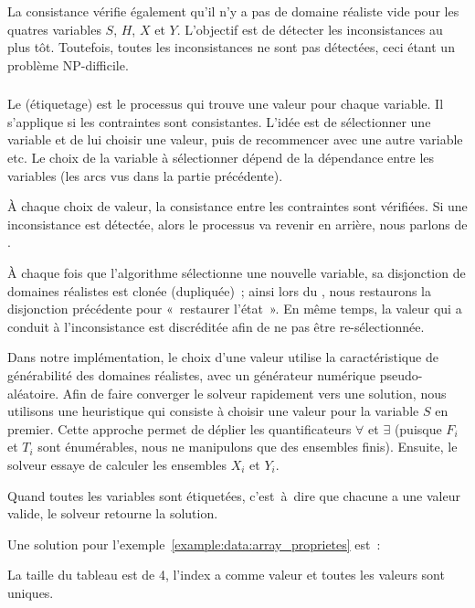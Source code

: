 La consistance vérifie également qu'il n'y a pas de domaine réaliste vide pour
les quatres variables $S$, $H$, $X$ et $Y$. L'objectif est de détecter les
inconsistances au plus tôt. Toutefois, toutes les inconsistances ne sont pas
détectées, ceci étant un problème NP-difficile.

\subsubsection{}

Le  (étiquetage) est le processus qui trouve une valeur
pour chaque variable. Il s'applique si les contraintes sont consistantes. L'idée
est de sélectionner une variable et de lui choisir une valeur, puis de
recommencer avec une autre variable etc. Le choix de la variable à sélectionner
dépend de la dépendance entre les variables (les arcs vus dans la partie
précédente).

À chaque choix de valeur, la consistance entre les contraintes sont
vérifiées. Si une inconsistance est détectée, alors le processus va revenir en
arrière, nous parlons de .

À chaque fois que l'algorithme sélectionne une nouvelle variable, sa disjonction
de domaines réalistes est clonée (dupliquée)~; ainsi lors du
, nous restaurons la disjonction précédente pour
«~restaurer l'état~». En même temps, la valeur qui a conduit à l'inconsistance
est discréditée afin de ne pas être re-sélectionnée.

Dans notre implémentation, le choix d'une valeur utilise la caractéristique de
générabilité des domaines réalistes, avec un générateur numérique
pseudo-aléatoire. Afin de faire converger le solveur rapidement vers une
solution, nous utilisons une heuristique qui consiste à choisir une valeur pour
la variable $S$ en premier.  Cette approche permet de déplier les
quantificateurs $\forall$ et $\exists$ (puisque $F_i$ et $T_i$ sont énumérables,
nous ne manipulons que des ensembles finis). Ensuite, le solveur essaye de
calculer les ensembles $X_i$ et $Y_i$.

Quand toutes les variables sont étiquetées, c'est~à~dire que chacune a une
valeur valide, le solveur retourne la solution.

\begin{example}

Une solution pour l'exemple~\ref{example:data:array_proprietes} est~:
%
\begin{pre}
[ \\
    0 => 'c', \\
    1 => 'd', \\
    2 => 'a', \\
    3 => 'e' \\
]
\end{pre}
%
La taille du tableau est de 4, l'index  a comme valeur  et
toutes les valeurs sont uniques.

\end{example}
